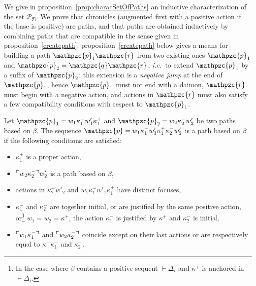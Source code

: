 \documentclass{LMCS}
\def\ie{{\em i.e.}}
\newcommand{\design}[1]{{\mathfrak{#1}}}
\newcommand{\pathLL}[1]{\mathpzc{#1}}\newcommand{\strategy}[1]{\pathLL{#1}}\newcommand{\view}[1]{\raisebox{.3ex}{$\ulcorner$}{#1}\raisebox{.3ex}{$\urcorner$}}\newcommand{\fullview}[1]{\raisebox{.3ex}{$\ulcorner\mkern-6mu\ulcorner\mkern-2mu$}{#1}\raisebox{.3ex}{$\mkern-2mu\urcorner\mkern-6mu\urcorner$}}\newcommand{\views}[1]{\view{#1}}\newcommand{\fullviews}[1]{\fullview{#1}}\newcommand{\shuffle}[1]{\llcorner\design{#1}\lrcorner}\newcommand{\PoD}[1]{{\mathcal{P}}_{#1}}\newcommand{\norm}[1]{\llbracket\design{#1}\rrbracket}
\begin{document}
We give in proposition~\ref{prop:characSetOfPaths} an inductive characterization of the set $\PoD{\design{R}}$. 
 We prove that chronicles (augmented first with a positive action if the base is positive) are paths, and that paths are obtained inductively by combining paths that are compatible in the sense given in proposition~\ref{createpath}:
  proposition~\ref{createpath} below gives a means for building a path $\pathLL{p}_1\pathLL{r}$ from two existing ones $\pathLL{p}_1$ and $\pathLL{p}_2 = \pathLL{q}\pathLL{r}$,
\ie\ to extend $\pathLL{p}_1$ by a suffix of $\pathLL{p}_2$: this extension is a {\em negative jump} at the end of $\pathLL{p}_1$, hence $\pathLL{p}_1$ must not end with a daimon, $\pathLL{r}$ must begin with a negative action, and actions in $\pathLL{r}$ must also satisfy a few compatibility conditions with respect to $\pathLL{p}_1$.
\begin{prop}\label{createpath}
Let $\pathLL{p}_1=w_1\kappa_1^-w'_1\kappa^+_1$ and $\pathLL{p}_2=w_2\kappa_2^-w'_2$ be two paths based on $\beta$.
The sequence $\pathLL{p}=w_1\kappa_1^-w'_1\kappa_1^+\kappa_2^-w'_2$ is
a path based on $\beta$ if the following conditions are satisfied:
\begin{itemize}[label=$-$]
\item $\kappa^+_1$ is a proper action,
\item $\view{w_2\kappa^-_2}w'_2$ is a path based on $\beta$,
\item actions in $\kappa_2^-w'_2$ and  $w_1\kappa_1^-w'_1\kappa^+_1$ have distinct focuses,
\item $\kappa^-_1$ and $\kappa_2^-$ are together initial, or are justified by the same positive action, or\footnote{In the case where $\beta$ contains a positive sequent $\vdash\Delta_i$ and $\kappa^+$ is anchored in $\vdash\Delta_i$.} $w_1=w_2=\kappa^+$, the action $\kappa_1^-$ is justified by $\kappa^+$ and $\kappa_2^-$ is initial, 
\item $\view{w_1\kappa^-_1}$ and $\view{w_2\kappa^-_2}$ coincide
  except on their last actions or are respectively equal to
  $\kappa^+\kappa_1^-$ and $\kappa^-_2$. 
\end{itemize}
\end{prop}
\end{document}
